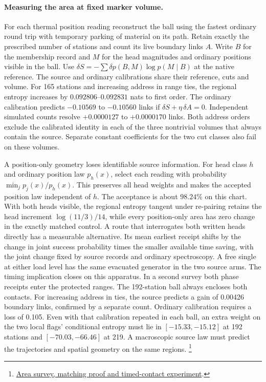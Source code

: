\documentclass[11pt]{article}
\begin{document}
\paragraph{Measuring the area at fixed marker volume.}
For each thermal position reading reconstruct the ball using the fastest
ordinary round trip with temporary parking of material on its path. Retain
exactly the prescribed number of stations and count its live boundary
links $A$. Write $B$ for the membership record and $M$ for the head
magnitudes and ordinary positions visible in the ball. Use
$\delta S=-\sum\delta p(B,M)\log p(M\mid B)$ at the native reference.
The source and ordinary calibrations share their reference, cuts and
volume. For 165 stations and increasing address in range ties, the
regional entropy increases by $0.092806$--$0.092831$ nats to first order.
The ordinary calibration predicts $-0.10569$ to $-0.10560$ links if
$\delta S+\eta\,\delta A=0$. Independent simulated counts resolve
$+0.0000127$ to $+0.0000170$ links. Both address orders exclude the
calibrated identity in each of the three nontrivial volumes that always
contain the source. Separate constant coefficients for the two cut
classes also fail on these volumes.

A position-only geometry loses identifiable source information. For
head class $h$ and ordinary position law $p_h(x)$, select each reading
with probability $\min_j p_j(x)/p_h(x)$. This preserves all head
weights and makes the accepted position law independent of $h$.
The acceptance is about $98.24\%$ on this chart. With both heads visible,
the regional entropy tangent under re-pairing retains the head increment
$\log(11/3)/14$, while every position-only area has zero change in the
exactly matched control. A route that interrogates both written heads
directly has a measurable alternative. Its mean earliest receipt shifts
by the change in joint success probability times the smaller available
time saving, with the joint change fixed by source records and ordinary
spectroscopy. A free single at either load level has the same evacuated
generator in the two source arms. The timing implication closes on this apparatus. In a second survey
both phase receipts enter the protected ranges. The 192-station ball
always encloses both contacts. For increasing address in ties, the
source predicts a gain of 0.00426 boundary links, confirmed by a separate
count. Ordinary calibration requires a loss of 0.105. Even with that
calibration repeated in each ball, an extra weight on the two local flags'
conditional entropy must lie in $[-15.33,-15.12]$ at 192 stations and
$[-70.03,-66.46]$ at 219. A macroscopic source law must predict the
trajectories and spatial geometry on the same regions.%
\footnote{\href{https://github.com/FloatingPragma/observer-patch-holography/blob/main/model/experiments/interval_echo_shell_flux/product_address/green_response/material_recoil/overlap_source/native_boundary/stock/aperture/THERMAL_RESULTS.md}{Area survey, matching proof and timed-contact experiment}.}
\end{document}
